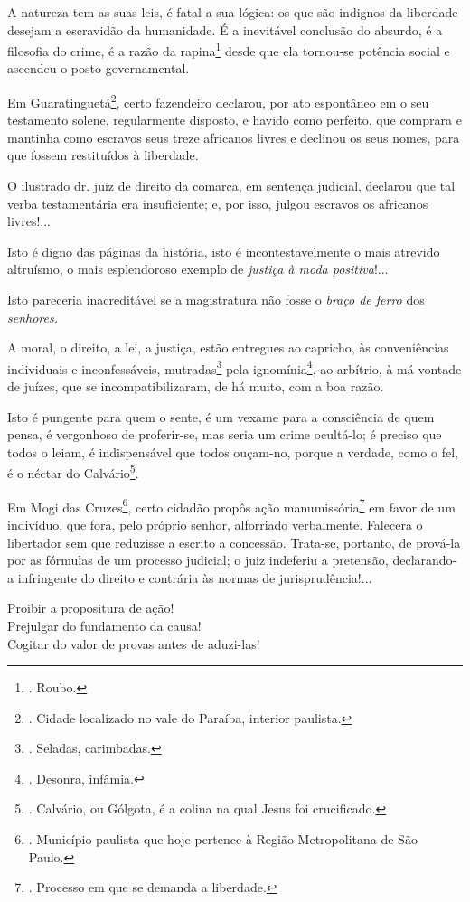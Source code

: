 A natureza tem as suas leis, é fatal a sua lógica: os que são indignos
da liberdade desejam a escravidão da humanidade. É a inevitável
conclusão do absurdo, é a filosofia do crime, é a razão da
rapina\footnote{. Roubo.} desde que ela tornou-se potência social e
ascendeu o posto governamental.

Em Guaratinguetá\footnote{. Cidade localizado no vale do Paraíba,
  interior paulista.}, certo fazendeiro declarou, por ato espontâneo em
o seu testamento solene, regularmente disposto, e havido como perfeito,
que comprara e mantinha como escravos seus treze africanos livres e
declinou os seus nomes, para que fossem restituídos à liberdade.

O ilustrado dr. juiz de direito da comarca, em sentença judicial,
declarou que tal verba testamentária era insuficiente; e, por isso,
julgou escravos os africanos livres!...

Isto é digno das páginas da história, isto é incontestavelmente o mais
atrevido altruísmo, o mais esplendoroso exemplo de \emph{justiça à moda
positiva}!...

Isto pareceria inacreditável se a magistratura não fosse o \emph{braço
de ferro} dos \emph{senhores.}

A moral, o direito, a lei, a justiça, estão entregues ao capricho, às
conveniências individuais e inconfessáveis, mutradas\footnote{. Seladas,
  carimbadas.} pela ignomínia\footnote{. Desonra, infâmia.}, ao
arbítrio, à má vontade de juízes, que se incompatibilizaram, de há
muito, com a boa razão.

Isto é pungente para quem o sente, é um vexame para a consciência de
quem pensa, é vergonhoso de proferir-se, mas seria um crime ocultá-lo; é
preciso que todos o leiam, é indispensável que todos ouçam-no, porque a
verdade, como o fel, é o néctar do Calvário\footnote{. Calvário, ou
  Gólgota, é a colina na qual Jesus foi crucificado.}.

Em Mogi das Cruzes\footnote{. Município paulista que hoje pertence à
  Região Metropolitana de São Paulo.}, certo cidadão propôs ação
manumissória\footnote{. Processo em que se demanda a liberdade.} em
favor de um indivíduo, que fora, pelo próprio senhor, alforriado
verbalmente. Falecera o libertador sem que reduzisse a escrito a
concessão. Trata-se, portanto, de prová-la por as fórmulas de um
processo judicial; o juiz indeferiu a pretensão, declarando-a
infringente do direito e contrária às normas de jurisprudência!...

Proibir a propositura de ação!\\
Prejulgar do fundamento da causa!\\
Cogitar do valor de provas antes de aduzi-las!

